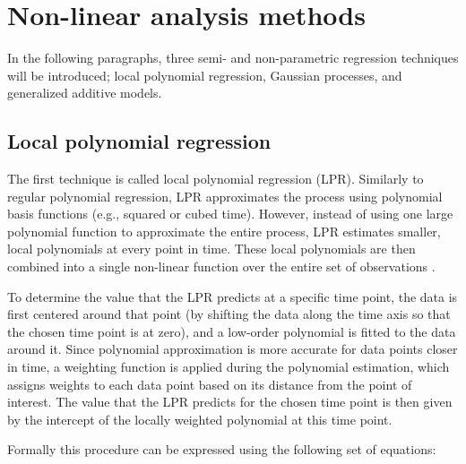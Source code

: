 \documentclass[man, floatsintext]{apa7}
\begin{document}
\section{Non-linear analysis methods}\label{method_introduction}

In the following paragraphs, three semi- and non-parametric regression
techniques will be introduced; local polynomial regression, Gaussian processes,
and generalized additive models.

\subsection{Local polynomial regression}

The first technique is called local polynomial regression (LPR). Similarly to
regular polynomial regression, LPR approximates the process using polynomial
basis functions (e.g., squared or cubed time). However, instead of using one
large polynomial function to approximate the entire process, LPR estimates
smaller, local polynomials at every point in time. These local polynomials are
then combined into a single non-linear function over the entire set of
observations \parencite{fan_adaptive_1995, ruppert_multivariate_1994,
  fan_local_2018}.

To determine the value that the LPR predicts at a specific time point, the data
is first centered around that point (by shifting the data along the time axis
so that the chosen time point is at zero), and a low-order polynomial is fitted
to the data around it. Since polynomial approximation is more accurate for data
points closer in time, a weighting function is applied during the polynomial
estimation, which assigns weights to each data point based on its distance from
the point of interest. The value that the LPR predicts for the chosen time
point is then given by the intercept of the locally weighted polynomial at this
time point.

Formally this procedure can be expressed using the following set of equations:
\end{document}
